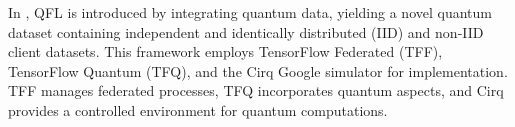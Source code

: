 In \cite{chehimi2022quantum}, QFL is introduced by integrating quantum data, yielding a novel quantum dataset containing independent and identically distributed (IID) and non-IID client datasets. This framework employs TensorFlow Federated (TFF), TensorFlow Quantum (TFQ), and the Cirq Google simulator for implementation. TFF manages federated processes, TFQ incorporates quantum aspects, and Cirq provides a controlled environment for quantum computations. 
\begin{comment}



\gangli{A good paper introduction is fairly formulaic. 
If you follow a simple set of rules, 
you can write a very good introduction. 
The following outline can be varied. 
For example, 
you can use two paragraphs instead of one, 
or you can place more emphasis on one aspect of the intro than another. 
But in all cases, 
all of the points below need to be covered in an introduction, 
and in most papers, 
you don't need to cover anything more in an introduction.}



\todo{Motivation}
At a high level, 
what is the problem area you are working in and why is it important? 
It is important to set the larger context here. 
Why is the problem of interest and importance to the larger community?


\todo{What is the specific problem considered in this paper?}
This paragraph narrows down the topic area of the paper. 
In the first paragraph you have established general context and importance. 
Here you establish specific context and background.


\end{comment}
